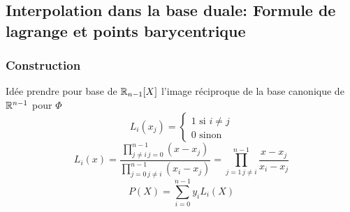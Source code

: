 \subsection{Interpolation dans la base duale: Formule de lagrange et points barycentrique}
\subsubsection{Construction}
Idée prendre pour base de $\mathbb{R}_{n-1}[X]$ l'image réciproque de la base canonique de $\mathbb{R}^{n-1}$ pour $\Phi$ 
\[
L_i(x_j) = \begin{cases}
    1 \text{ si } i \neq j\\
    0 \text{ sinon}
\end{cases}
\] 
\[
    L_i(x) = \frac{\prod_{j\neq i \, j = 0}^{n-1}(x - x_j) }{\prod_{j = 0 \, j \neq i}^{n-1} (x_i - x_j) } = \prod_{j = 1 \, j \neq i}^{n-1} \frac{x - x_j}{x_i - x_j} 
\] 
\[
P(X) = \sum_{i=0}^{n-1} y_iL_i(X)
\] 
